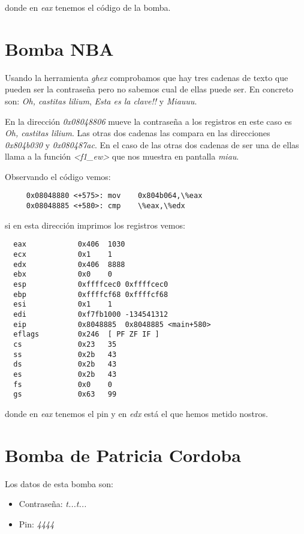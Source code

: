 \documentclass{article}
\begin{document}
donde en \textit{eax} tenemos el código de la bomba.

\section{Bomba NBA}

Usando la herramienta \textit{ghex} comprobamos que hay tres cadenas
de texto que pueden ser la contraseña pero no sabemos cual de ellas
puede ser. En concreto son: \textit{Oh, castitas lilium}, \textit{Esta
  es la clave!!} y \textit{Miauuu}.

En la dirección \textit{0x08048806} mueve la contraseña a los
registros en este caso es \textit{Oh, castitas lilium}. Las otras dos
cadenas las compara en las direcciones \textit{0x804b030} y
\textit{0x080487ac}. En el caso de las otras dos cadenas de ser una de
ellas llama a la función \textit{<f1\_ew>} que nos muestra en pantalla
\textit{miau}.

Observando el código vemos:

\begin{lstlisting}
     0x08048880 <+575>:	mov    0x804b064,\%eax
     0x08048885 <+580>:	cmp    \%eax,\%edx
\end{lstlisting}

si en esta dirección imprimos los registros vemos:

\begin{lstlisting}
  eax            0x406	1030
  ecx            0x1	1
  edx            0x406	8888
  ebx            0x0	0
  esp            0xffffcec0	0xffffcec0
  ebp            0xffffcf68	0xffffcf68
  esi            0x1	1
  edi            0xf7fb1000	-134541312
  eip            0x8048885	0x8048885 <main+580>
  eflags         0x246	[ PF ZF IF ]
  cs             0x23	35
  ss             0x2b	43
  ds             0x2b	43
  es             0x2b	43
  fs             0x0	0
  gs             0x63	99

\end{lstlisting}

donde en \textit{eax} tenemos el pin y en \textit{edx} está el que
hemos metido nostros.
   
\section{Bomba de Patricia Cordoba}

Los datos de esta bomba son:

\begin{itemize}
  \item Contraseña: \textit{t...t...}
  \item Pin: \textit{4444}
\end{itemize}
\end{document}

